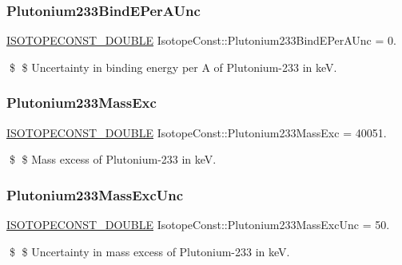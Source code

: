 \subsubsection{\texorpdfstring{Plutonium233\+Bind\+E\+Per\+A\+Unc}{Plutonium233BindEPerAUnc}}
{\footnotesize\ttfamily \mbox{\hyperlink{group___isotope_const-_macros_ga8f45a7272ce02c0b4c65c44636ed719a}{I\+S\+O\+T\+O\+P\+E\+C\+O\+N\+S\+T\+\_\+\+D\+O\+U\+B\+LE}} Isotope\+Const\+::\+Plutonium233\+Bind\+E\+Per\+A\+Unc = 0.}

\$ \$ Uncertainty in binding energy per A of Plutonium-\/233 in keV. \mbox{\label{group___isotope_const-_plutonium-_pu233_ga6a58aa528b9dc75bd7ae8c1ee442e5e7}} 
\subsubsection{\texorpdfstring{Plutonium233\+Mass\+Exc}{Plutonium233MassExc}}
{\footnotesize\ttfamily \mbox{\hyperlink{group___isotope_const-_macros_ga8f45a7272ce02c0b4c65c44636ed719a}{I\+S\+O\+T\+O\+P\+E\+C\+O\+N\+S\+T\+\_\+\+D\+O\+U\+B\+LE}} Isotope\+Const\+::\+Plutonium233\+Mass\+Exc = 40051.}

\$ \$ Mass excess of Plutonium-\/233 in keV. \mbox{\label{group___isotope_const-_plutonium-_pu233_gab612f15febfc06eb0780b172472cb6e9}} 
\subsubsection{\texorpdfstring{Plutonium233\+Mass\+Exc\+Unc}{Plutonium233MassExcUnc}}
{\footnotesize\ttfamily \mbox{\hyperlink{group___isotope_const-_macros_ga8f45a7272ce02c0b4c65c44636ed719a}{I\+S\+O\+T\+O\+P\+E\+C\+O\+N\+S\+T\+\_\+\+D\+O\+U\+B\+LE}} Isotope\+Const\+::\+Plutonium233\+Mass\+Exc\+Unc = 50.}

\$ \$ Uncertainty in mass excess of Plutonium-\/233 in keV. \mbox{\label{group___isotope_const-_plutonium-_pu233_ga585879e69d9419b662f8f553b80fcfa5}} 
